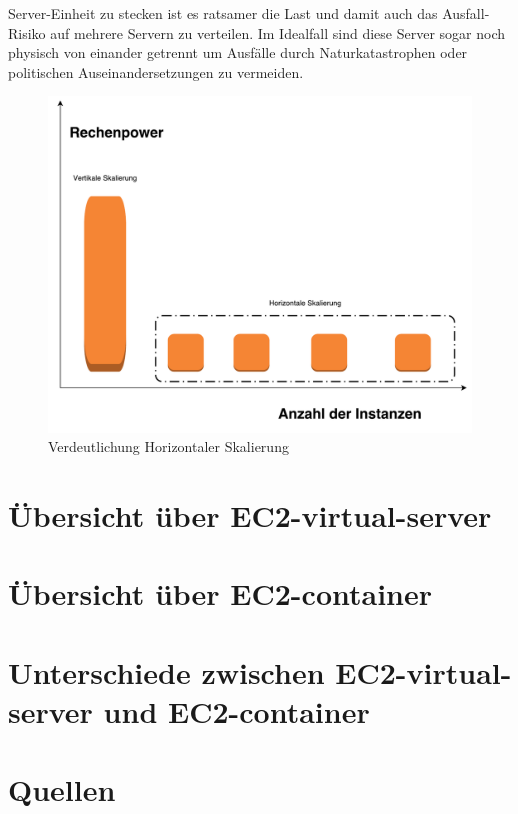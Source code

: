 \documentclass[titlepage]{report}
\begin{document}
Server-Einheit zu stecken ist es ratsamer die Last und damit auch das
Ausfall-Risiko auf mehrere Servern zu verteilen. Im Idealfall sind diese
Server sogar noch physisch von einander getrennt um Ausfälle durch
Naturkatastrophen oder politischen Auseinandersetzungen zu vermeiden.
\begin{figure}
    \centering
    \includegraphics[width=1.0\textwidth]{figures/scalability.pdf}
    \caption{Verdeutlichung Horizontaler Skalierung}\label{fig:1}
\end{figure}
\newpage
\chapter{Übersicht über EC2-virtual-server}
\newpage
\chapter{Übersicht über EC2-container}
\newpage
\chapter{Unterschiede zwischen EC2-virtual-server und EC2-container}
\newpage
\chapter{Quellen}
\nocite{*}


\listoffigures
\end{document}
